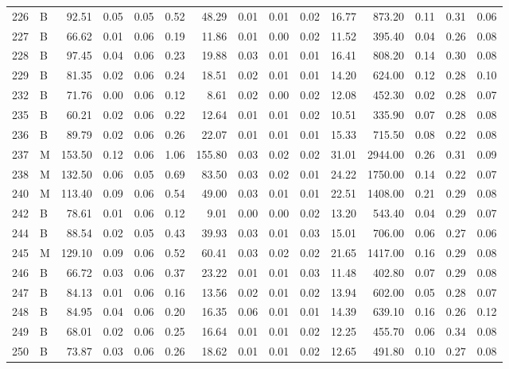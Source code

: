 \begin{table}[ht]
\begin{tabular}{rlrrrrrrrrrrrrr}
  226 & B & 92.51 & 0.05 & 0.05 & 0.52 & 48.29 & 0.01 & 0.01 & 0.02 & 16.77 & 873.20 & 0.11 & 0.31 & 0.06 \\ 
  227 & B & 66.62 & 0.01 & 0.06 & 0.19 & 11.86 & 0.01 & 0.00 & 0.02 & 11.52 & 395.40 & 0.04 & 0.26 & 0.08 \\ 
  228 & B & 97.45 & 0.04 & 0.06 & 0.23 & 19.88 & 0.03 & 0.01 & 0.01 & 16.41 & 808.20 & 0.14 & 0.30 & 0.08 \\ 
  229 & B & 81.35 & 0.02 & 0.06 & 0.24 & 18.51 & 0.02 & 0.01 & 0.01 & 14.20 & 624.00 & 0.12 & 0.28 & 0.10 \\ 
  232 & B & 71.76 & 0.00 & 0.06 & 0.12 & 8.61 & 0.02 & 0.00 & 0.02 & 12.08 & 452.30 & 0.02 & 0.28 & 0.07 \\ 
  235 & B & 60.21 & 0.02 & 0.06 & 0.22 & 12.64 & 0.01 & 0.01 & 0.02 & 10.51 & 335.90 & 0.07 & 0.28 & 0.08 \\ 
  236 & B & 89.79 & 0.02 & 0.06 & 0.26 & 22.07 & 0.01 & 0.01 & 0.01 & 15.33 & 715.50 & 0.08 & 0.22 & 0.08 \\ 
  237 & M & 153.50 & 0.12 & 0.06 & 1.06 & 155.80 & 0.03 & 0.02 & 0.02 & 31.01 & 2944.00 & 0.26 & 0.31 & 0.09 \\ 
  238 & M & 132.50 & 0.06 & 0.05 & 0.69 & 83.50 & 0.03 & 0.02 & 0.01 & 24.22 & 1750.00 & 0.14 & 0.22 & 0.07 \\ 
  240 & M & 113.40 & 0.09 & 0.06 & 0.54 & 49.00 & 0.03 & 0.01 & 0.01 & 22.51 & 1408.00 & 0.21 & 0.29 & 0.08 \\ 
  242 & B & 78.61 & 0.01 & 0.06 & 0.12 & 9.01 & 0.00 & 0.00 & 0.02 & 13.20 & 543.40 & 0.04 & 0.29 & 0.07 \\ 
  244 & B & 88.54 & 0.02 & 0.05 & 0.43 & 39.93 & 0.03 & 0.01 & 0.03 & 15.01 & 706.00 & 0.06 & 0.27 & 0.06 \\ 
  245 & M & 129.10 & 0.09 & 0.06 & 0.52 & 60.41 & 0.03 & 0.02 & 0.02 & 21.65 & 1417.00 & 0.16 & 0.29 & 0.08 \\ 
  246 & B & 66.72 & 0.03 & 0.06 & 0.37 & 23.22 & 0.01 & 0.01 & 0.03 & 11.48 & 402.80 & 0.07 & 0.29 & 0.08 \\ 
  247 & B & 84.13 & 0.01 & 0.06 & 0.16 & 13.56 & 0.02 & 0.01 & 0.02 & 13.94 & 602.00 & 0.05 & 0.28 & 0.07 \\ 
  248 & B & 84.95 & 0.04 & 0.06 & 0.20 & 16.35 & 0.06 & 0.01 & 0.01 & 14.39 & 639.10 & 0.16 & 0.26 & 0.12 \\ 
  249 & B & 68.01 & 0.02 & 0.06 & 0.25 & 16.64 & 0.01 & 0.01 & 0.02 & 12.25 & 455.70 & 0.06 & 0.34 & 0.08 \\ 
  250 & B & 73.87 & 0.03 & 0.06 & 0.26 & 18.62 & 0.01 & 0.01 & 0.02 & 12.65 & 491.80 & 0.10 & 0.27 & 0.08 \\ 

\end{tabular}
\end{table}
